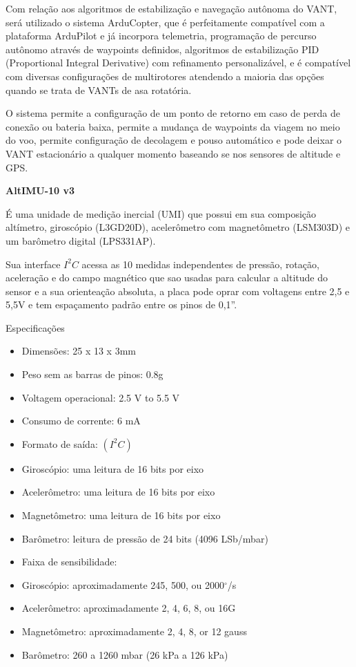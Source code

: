 Com relação aos algoritmos de estabilização e navegação autônoma do VANT, será utilizado o sistema ArduCopter, que é perfeitamente compatível com a plataforma ArduPilot e já incorpora telemetria, programação de percurso autônomo através de waypoints definidos, algoritmos de estabilização PID (Proportional Integral Derivative) com refinamento personalizável, e é compatível com diversas configurações de multirotores atendendo a maioria das opções quando se trata de VANTs de asa rotatória.

O sistema permite a configuração de um ponto de retorno em caso de perda de conexão ou bateria baixa, permite a mudança de waypoints da viagem no meio do voo, permite configuração de decolagem e pouso automático e pode deixar o VANT estacionário a qualquer momento baseando se nos sensores de altitude e GPS.

\textbf{AltIMU-10 v3}

É uma unidade de medição inercial (UMI) que possui em sua composição altímetro, giroscópio (L3GD20D), acelerômetro com magnetômetro (LSM303D) e um barômetro digital (LPS331AP).

Sua interface $ I^{2}C $ acessa as 10 medidas independentes de pressão, rotação, aceleração e do campo magnético que sao usadas para calcular a altitude do sensor e a sua orienteação absoluta, a placa pode oprar com voltagens entre 2,5 e 5,5V e tem espaçamento padrão entre os pinos de 0,1”.

Especificações
\begin{itemize}
	\item Dimensões: 25 x 13 x 3mm
	\item Peso sem as barras de pinos: 0.8g
	\item Voltagem operacional: 2.5 V to 5.5 V
	\item Consumo de corrente: 6 mA
	\item Formato de saída: $ (I^{2}C) $
	\item Giroscópio: uma leitura de 16 bits por eixo
	\item Acelerômetro: uma leitura de 16 bits por eixo
	\item Magnetômetro: uma leitura de 16 bits por eixo
	\item Barômetro: leitura de pressão de 24 bits (4096 LSb/mbar)
	\item Faixa de sensibilidade:
	\item Giroscópio: aproximadamente 245, 500, ou 2000$ ^{\circ} $/s
	\item Acelerômetro: aproximadamente 2, 4, 6, 8, ou 16G
	\item Magnetômetro: aproximadamente 2, 4, 8, or 12 gauss
	\item Barômetro: 260 a 1260 mbar (26 kPa a 126 kPa)
\end{itemize}

